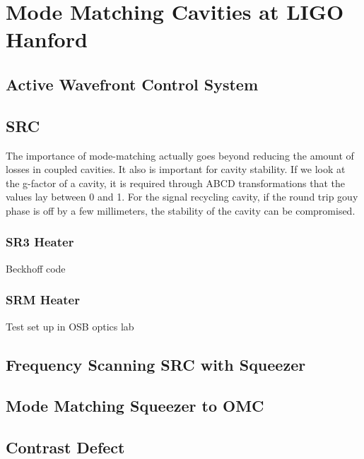 \chapter{Mode Matching Cavities at LIGO Hanford}

	\section{Active Wavefront Control System}
	
	\section{SRC}
	The importance of mode-matching actually goes beyond reducing the amount of losses in coupled cavities.  It also is important for cavity stability.  If we look at the g-factor of a cavity, it is required through ABCD transformations that the values lay between 0 and 1.  For the signal recycling cavity, if the round trip gouy phase is off by a few millimeters, the stability of the cavity can be compromised. 
	
	\subsection{SR3 Heater}
	Beckhoff code
	
	
	\subsection{SRM Heater}
	Test set up in OSB optics lab
	
	\section{Frequency Scanning SRC with Squeezer}
	
	\section{Mode Matching Squeezer to OMC}

	\section{Contrast Defect}
	